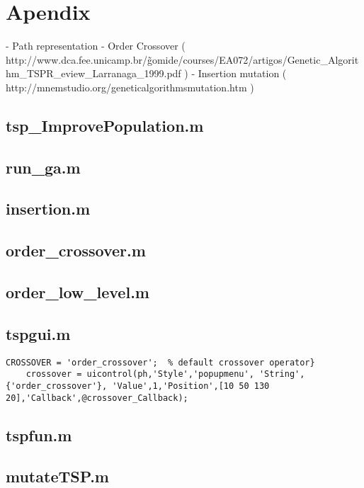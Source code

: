 

\section{Apendix}
    - Path representation
    - Order Crossover ( http://www.dca.fee.unicamp.br/\~gomide/courses/EA072/artigos/Genetic\_Algorithm\_TSPR\_eview\_Larranaga\_1999.pdf )
    - Insertion mutation ( http://mnemstudio.org/genetic\-algorithms\-mutation.htm )


\subsection{tsp\_ImprovePopulation.m}

\subsection{run\_ga.m}

\subsection{insertion.m}

\subsection{order\_crossover.m}

\subsection{order\_low\_level.m}

\subsection{tspgui.m}
    \begin{lstlisting}[frame=single]
    CROSSOVER = 'order_crossover';  % default crossover operator}
    crossover = uicontrol(ph,'Style','popupmenu', 'String',{'order_crossover'}, 'Value',1,'Position',[10 50 130 20],'Callback',@crossover_Callback);
    \end{lstlisting}
\subsection{tspfun.m}

\subsection{mutateTSP.m}




